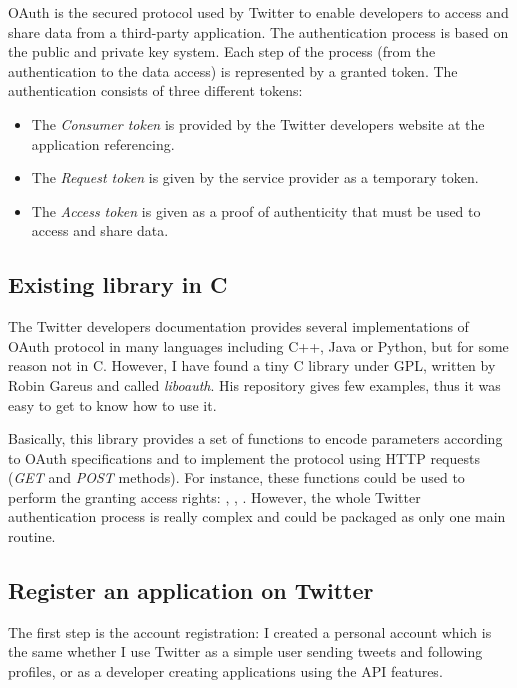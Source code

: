 \clearpage

OAuth is the secured protocol used by Twitter to enable developers to access and share data from a third-party application. The authentication process is based on the public and private key system. Each step of the process (from the authentication to the data access) is represented by a granted token. The authentication consists of three different tokens:
\begin{itemize}
\item The \textit{Consumer token} is provided by the Twitter developers website at the application referencing.
\item The \textit{Request token} is given by the service provider as a temporary token.
\item The \textit{Access token} is given as a proof of authenticity that must be used to access and share data.
\end{itemize}


\subsection{Existing library in C}

\hspace{15mm}The Twitter developers documentation provides several implementations of OAuth protocol in many languages including C++, Java or Python, but for some reason not in C. However, I have found a tiny C library under GPL, written by Robin Gareus and called \textit{liboauth}. His repository gives few examples, thus it was easy to get to know how to use it.

Basically, this library provides a set of functions to encode parameters according to OAuth specifications and to implement the protocol using HTTP requests (\textit{GET} and \textit{POST} methods). For instance, these functions could be used to perform the granting access rights: , , . However, the whole Twitter authentication process is really complex and could be packaged as only one main routine.


\subsection{Register an application on Twitter}

\hspace{15mm}The first step is the account registration: I created a personal account which is the same whether I use Twitter as a simple user sending tweets and following profiles, or as a developer creating applications using the API features.

